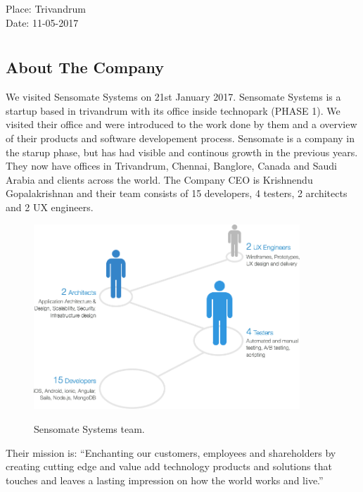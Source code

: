 \documentclass[a4paper,12pt]{report}
\begin{document}
\begin{titlepage}
		\begin{flushleft}
		Place: Trivandrum\\
		Date:  11-05-2017\\
		\end{flushleft}
		\vfill %
	\end{titlepage}

	
	\newpage
	\tableofcontents
	\newpage

	\chapter*{}
	\newpage
		\section{About The Company}
		We visited Sensomate Systems on 21st January 2017. Sensomate Systems is a startup based in trivandrum with its office inside technopark (PHASE 1). We visited their office and were introduced to the work done by them and a overview of their products and software developement process. Sensomate is a company in the starup phase, but has had visible and continous growth in the previous years. They now have offices in Trivandrum, Chennai, Banglore, Canada and Saudi Arabia and clients across the world. The Company CEO is Krishnendu Gopalakrishnan and their team consists of 15 developers, 4 testers, 2 architects and 2 UX engineers.  
		\begin{figure}[H]
			\begin{centering}
				\includegraphics[width=10cm]{images/team.png}\\
				\caption{Sensomate Systems team.}
			\end{centering}
		\end{figure}
		Their mission is: ``Enchanting our customers, employees and shareholders by creating cutting edge and value add technology products and solutions that touches and leaves a lasting impression on how the world works and live.''
\end{document}
